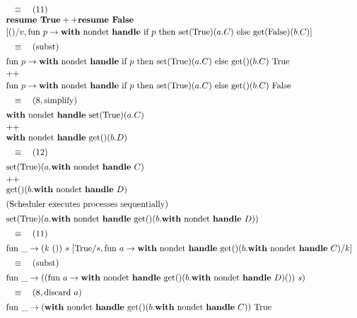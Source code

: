 \documentclass[logo,bsc,singlespacing,parskip]{infthesis}
\begin{document}
\[
\begin{array}{l}
\quad\equiv\quad (11) \quad \\ 
\text{\textbf{resume True}} ++ \text{\textbf{resume False}} \\[2pt]
[()/v, \text{fun } p \rightarrow \text{\textbf{with} nondet \textbf{handle} if } p \text{ then set(True)}(a.C) \text{ else get(False)}(b.C)] \\[5pt]
\quad\equiv\quad (\text{subst}) \\[5pt]
\text{fun } p \rightarrow \text{\textbf{with} nondet \textbf{handle} if } p \text{ then set(True)}(a.C) \text{ else get()}(b.C)\ \text{True} \\[2pt]
++ \\[2pt]
\text{fun } p \rightarrow \text{\textbf{with} nondet \textbf{handle} if } p \text{ then set(True)}(a.C) \text{ else get()}(b.C)\ \text{False} \\[5pt]
\quad\equiv\quad (8, \text{simplify}) \\[5pt]
\text{\textbf{with} nondet \textbf{handle} set(True)}(a.C) \\[2pt]
++ \\ \text{\textbf{with} nondet \textbf{handle} get()}(b.D) \\[5pt]
\quad\equiv\quad (12) \\[5pt]
\text{set(True)}(a.\text{\textbf{with} nondet \textbf{handle} } C) \\[2pt]
++ \\ \text{get()}(b.\text{\textbf{with} nondet \textbf{handle} } D) \\[5pt]
(\text{Scheduler executes processes sequentially}) \\[5pt]
\text{set(True)}(a.\text{\textbf{with} nondet \textbf{handle} get()}(b. \text{\textbf{with} nondet \textbf{handle} } D)) \\[5pt]
\quad\equiv\quad (11) \\[5pt]
\text{fun } \_ \rightarrow (k\ ())\ s\ [\text{True}/s, \text{fun } a \rightarrow \text{\textbf{with} nondet \textbf{handle} get()}(b. \text{\textbf{with} nondet \textbf{handle} } C) / k] \\[5pt]
\quad\equiv\quad (\text{subst}) \\[5pt]
\text{fun } \_ \rightarrow ( ( \text{fun } a \rightarrow \text{\textbf{with} nondet \textbf{handle} get()}(b. \text{\textbf{with} nondet \textbf{handle} } D) ())\ s) \\[5pt]
\quad\equiv\quad (8, \text{discard } a) \\[5pt]
\text{fun } \_ \rightarrow (\text{\textbf{with} nondet \textbf{handle} get()}(b. \text{\textbf{with} nondet \textbf{handle} } C)) \text{ True} \\[5pt]

\end{array}\]
\end{document}
